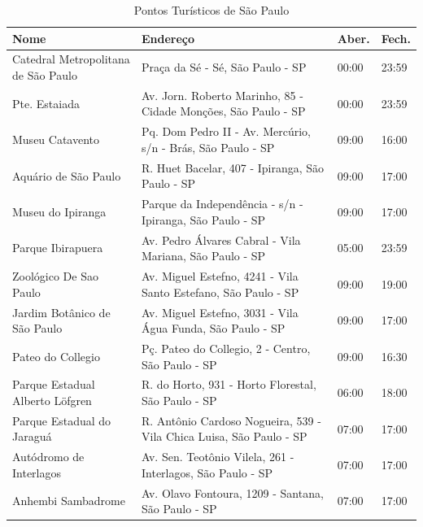 \begin{table}[h]
	\centering
	\caption{Pontos Turísticos de São Paulo}
	\label{Roteiro5}
	\begin{tabular}{C{3cm}C{8cm}C{2cm}C{2cm}}
		\toprule
		Nome                     & Endereço                                                         & Aber. & Fech. \\ \midrule
		Catedral Metropolitana de São Paulo & Praça da Sé - Sé, São Paulo - SP                                    & 00:00    & 23:59      \\
		Pte. Estaiada                       & Av. Jorn. Roberto Marinho, 85 - Cidade Monções, São Paulo - SP      & 00:00    & 23:59      \\
		Museu Catavento                     & Pq. Dom Pedro II - Av. Mercúrio, s/n - Brás, São Paulo - SP         & 09:00    & 16:00      \\
		Aquário de São Paulo                & R. Huet Bacelar, 407 - Ipiranga, São Paulo - SP                     & 09:00    & 17:00      \\
		Museu do Ipiranga                   & Parque da Independência - s/n - Ipiranga, São Paulo - SP            & 09:00    & 17:00      \\
		Parque Ibirapuera                   & Av. Pedro Álvares Cabral - Vila Mariana, São Paulo - SP             & 05:00    & 23:59      \\
		Zoológico De Sao Paulo              & Av. Miguel Estefno, 4241 - Vila Santo Estefano, São Paulo - SP      & 09:00    & 19:00      \\
		Jardim Botânico de São Paulo        & Av. Miguel Estefno, 3031 - Vila Água Funda, São Paulo - SP          & 09:00    & 17:00      \\
		Pateo do Collegio                   & Pç. Pateo do Collegio, 2 - Centro, São Paulo - SP                   & 09:00    & 16:30      \\
		Parque Estadual Alberto Löfgren     & R. do Horto, 931 - Horto Florestal, São Paulo - SP                  & 06:00    & 18:00      \\
		Parque Estadual do Jaraguá          & R. Antônio Cardoso Nogueira, 539 - Vila Chica Luisa, São Paulo - SP & 07:00    & 17:00      \\
		Autódromo de Interlagos             & Av. Sen. Teotônio Vilela, 261 - Interlagos, São Paulo - SP          & 07:00    & 17:00      \\
		Anhembi Sambadrome                  & Av. Olavo Fontoura, 1209 - Santana, São Paulo - SP                  & 07:00    & 17:00 \\ \bottomrule
	\end{tabular}
\end{table}

